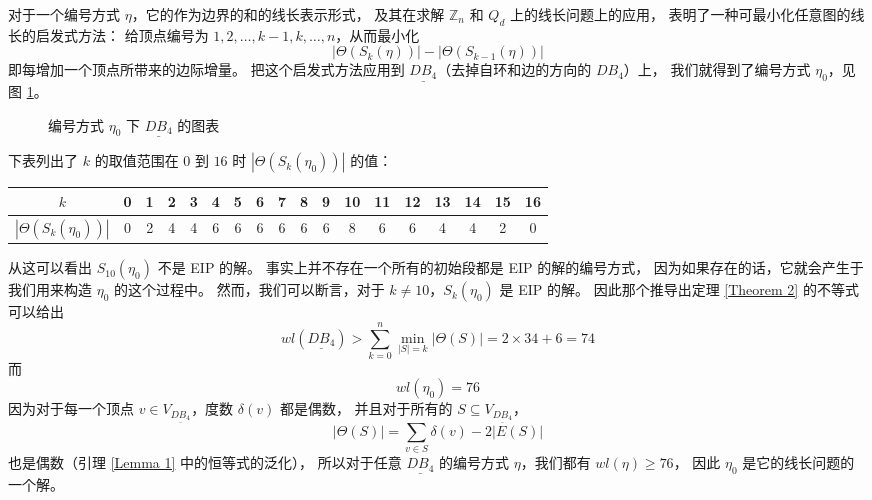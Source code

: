 \documentclass[12pt, a4paper]{article}
\begin{document}
对于一个编号方式 $\eta$，它的作为边界的和的线长表示形式，
及其在求解 $\mathbb{Z}_n$ 和 $Q_d$ 上的线长问题上的应用，
表明了一种可最小化任意图的线长的启发式方法：
给顶点编号为 $1, 2, \dots, k - 1, k, \dots, n$，从而最小化
\begin{equation*}
|\Theta(S_k(\eta))| - |\Theta(S_{k - 1}(\eta))|
\end{equation*}
即每增加一个顶点所带来的边际增量。
把这个启发式方法应用到 $\underline{DB_4}$（去掉自环和边的方向的 $DB_4$）上，
我们就得到了编号方式 $\eta_0$，见图 \ref{Figure 5}。

\begin{figure}
	\centering
	
	\caption{编号方式 $\eta_0$ 下 $\underline{DB_4}$ 的图表}
	\label{Figure 5}
\end{figure}

下表列出了 $k$ 的取值范围在 $0$ 到 $16$ 时 $|\Theta(S_k(\eta_0))|$ 的值：
\begin{center}
	\begin{tabular}{ c | c c c c c c c c c c c c c c c c c }
	$k$                     & 0 & 1 & 2 & 3 & 4 & 5 & 6 & 7 & 8 & 9
	                        & 10 & 11 & 12 & 13 & 14 & 15 & 16 \\
	\hline
	$|\Theta(S_k(\eta_0))|$ & 0 & 2 & 4 & 4 & 6 & 6 & 6 & 6 & 6 & 6
	                        &  8 &  6 &  6 &  4 &  4 &  2 &  0
	\end{tabular}
\end{center}
从这可以看出 $S_{10}(\eta_0)$ 不是 EIP 的解。
事实上并不存在一个所有的初始段都是 EIP 的解的编号方式，
因为如果存在的话，它就会产生于我们用来构造 $\eta_0$ 的这个过程中。
然而，我们可以断言，对于 $k \neq 10$，$S_k(\eta_0)$ 是 EIP 的解。
因此那个推导出定理 \ref{Theorem 2} 的不等式可以给出
\begin{equation*}
wl(\underline{DB_4}) > \sum_{k = 0}^n \min_{|S| = k} |\Theta(S)| = 2 \times 34 + 6 = 74
\end{equation*}
而
\begin{equation*}
wl(\eta_0) = 76
\end{equation*}
因为对于每一个顶点 $v \in V_{\underline{DB_4}}$，度数 $\delta(v)$ 都是偶数，
并且对于所有的 $S \subseteq V_{\underline{DB_4}}$，
\begin{equation*}
|\Theta(S)| = \sum_{v \in S} \delta(v) - 2 |E(S)|
\end{equation*}
也是偶数（引理 \ref{Lemma 1} 中的恒等式的泛化），
所以对于任意 $\underline{DB_4}$ 的编号方式 $\eta$，我们都有 $wl(\eta) \ge 76$，
因此 $\eta_0$ 是它的线长问题的一个解。
\end{document}
